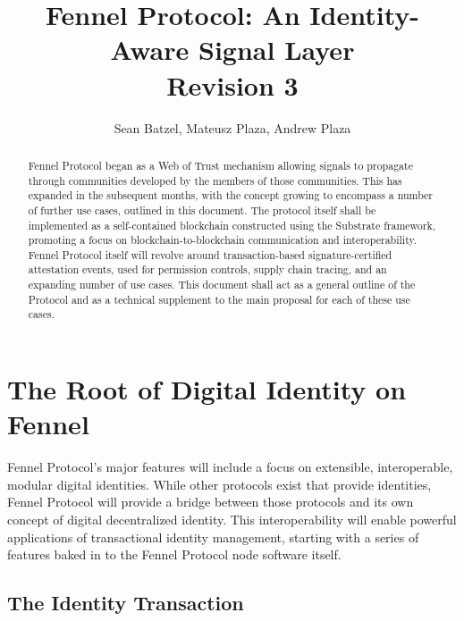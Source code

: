 \documentclass[]{article}
\title{Fennel Protocol: An Identity-Aware Signal Layer\\\large{Revision 3}}
\author{Sean Batzel, Mateusz Plaza, Andrew Plaza}
\begin{document}
\maketitle
\begin{abstract}
Fennel Protocol began as a Web of Trust mechanism allowing signals to propagate through communities developed by the members of those communities. This has expanded in the subsequent months, with the concept growing to encompass a number of further use cases, outlined in this document. The protocol itself shall be implemented as a self-contained blockchain constructed using the Substrate framework, promoting a focus on blockchain-to-blockchain communication and interoperability. Fennel Protocol itself will revolve around transaction-based signature-certified attestation events, used for permission controls, supply chain tracing, and an expanding number of use cases. This document shall act as a general outline of the Protocol and as a technical supplement to the main proposal for each of these use cases.
\end{abstract}
\clearpage

\tableofcontents

\listoffigures
\listoftables
\nocite{*}
\clearpage

\section{The Root of Digital Identity on Fennel}
\label{scrivauto:10}

Fennel Protocol's major features will include a focus on extensible, interoperable, modular digital identities. While other protocols exist that provide identities, Fennel Protocol will provide a bridge between those protocols and its own concept of digital decentralized identity. This interoperability will enable powerful applications of transactional identity management, starting with a series of features baked in to the Fennel Protocol node software itself.

\subsection{The Identity Transaction}
\label{scrivauto:11}
\end{document}
